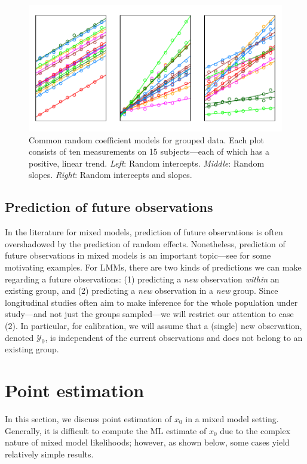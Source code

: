 \documentclass[cmfont,usenames,dvipsnames,leqno]{afit-etd}\usepackage[]{graphicx}\usepackage[]{color}
\makeatletter
\def\maxwidth{ %
  \ifdim\Gin@nat@width>\linewidth
    \linewidth
  \else
    \Gin@nat@width
  \fi
}
\newenvironment{knitrout}{}{} %
\renewenvironment{knitrout}{\begin{singlespace}}{\end{singlespace}}
\newcommand{\mc}[1]{\ensuremath{\mathcal{#1}}}
\makeatother
\begin{document}
\begin{knitrout}
\color{fgcolor}\begin{figure}[H]

\includegraphics[width=\maxwidth]{figure/random-coefficients} \caption[Common random coefficient models for grouped data]{Common random coefficient models for grouped data. Each plot consists of ten measurements on 15 subjects---each of which has a positive, linear trend. \textit{Left}: Random intercepts. \textit{Middle}: Random slopes. \textit{Right}: Random intercepts and slopes.\label{fig:random-coefficients}}
\end{figure}


\end{knitrout}


\subsection{Prediction of future observations}
In the literature for mixed models, prediction of future observations is often overshadowed by the prediction of random effects. Nonetheless, prediction of future observations in mixed models is an important topic---see \citet{jiang_linear_2007} for some motivating examples. For LMMs, there are two kinds of predictions we can make regarding a future observations: (1) predicting a \emph{new} observation \emph{within} an existing group, and (2) predicting a \emph{new} observation in a \emph{new} group. Since longitudinal studies often aim to make inference for the whole population under study---and not just the groups sampled---we will restrict our attention to case (2). In particular, for calibration, we will assume that a (single) new observation, denoted $\mc{Y}_0$, is independent of the current observations and does not belong to an existing group. 

\section{Point estimation}
\label{sec:calibration-lmm-point}
In this section, we discuss point estimation of $x_0$ in a mixed model setting. Generally, it is difficult to compute the \ac{ML} estimate of $x_0$ due to the complex nature of mixed model likelihoods; however, as shown below, some cases yield relatively simple results. 
\end{document}
